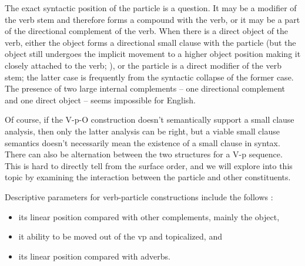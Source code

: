\documentclass[UTF8, a4paper, oneside, scheme=plain, 12pt]{ctexbook}
\newcommand*{\citesec}[1]{\S~{#1}}
\newcommand*{\citechap}[1]{Ch.~{#1}}
\begin{document}
The exact syntactic position of the particle is a question.
It may be a modifier of the verb stem and therefore forms a compound with the verb, 
or it may be a part of the directional complement of the verb.
When there is a direct object of the verb, 
either the object forms a directional small clause with the particle
(but the object still undergoes the implicit movement to a higher object position 
making it closely attached to the verb; ), 
or the particle is a direct modifier of the verb stem; 
the latter case is frequently from the syntactic collapse of the former case.
The presence of two large internal complements -- 
one directional complement and one direct object -- seems impossible for English.

Of course, if the V-p-O construction doesn't semantically support a small clause analysis, 
then only the latter analysis can be right, 
but a viable small clause semantics doesn't necessarily mean the existence of a small clause in syntax.
There can also be alternation between the two structures for a V-p sequence.
This is hard to directly tell from the surface order, 
and we will explore into this topic by examining the interaction between the particle and other constituents. 


Descriptive parameters for verb-particle constructions 
include the follows \citep[\citechap{4}, \citesec{6.3}]{cgel}:
\begin{itemize}
    \item its linear position compared with other complements, mainly the object, 
    \item it ability to be moved out of the \acs{vp}
        and topicalized, and 
    \item its linear position compared with adverbs.
\end{itemize}
\end{document}
